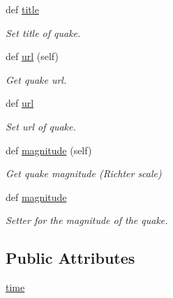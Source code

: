 \begin{DoxyCompactItemize}
def \hyperlink{classbridges_1_1data__src__dependent_1_1earthquake__usgs_1_1_earthquake_u_s_g_s_a8aa7ec15933f9416f84367a38a192575}{title}
\begin{DoxyCompactList}\small\item\em Set title of quake. \end{DoxyCompactList}\item 
def \hyperlink{classbridges_1_1data__src__dependent_1_1earthquake__usgs_1_1_earthquake_u_s_g_s_a449a372a14b288f7fd71066fb3886cd1}{url} (self)
\begin{DoxyCompactList}\small\item\em Get quake url. \end{DoxyCompactList}\item 
def \hyperlink{classbridges_1_1data__src__dependent_1_1earthquake__usgs_1_1_earthquake_u_s_g_s_afc4af59842186d2f0198b3e6d0690a95}{url}
\begin{DoxyCompactList}\small\item\em Set url of quake. \end{DoxyCompactList}\item 
def \hyperlink{classbridges_1_1data__src__dependent_1_1earthquake__usgs_1_1_earthquake_u_s_g_s_a2ada4ba221f09e4fd249ba53f5647d61}{magnitude} (self)
\begin{DoxyCompactList}\small\item\em Get quake magnitude (Richter scale) \end{DoxyCompactList}\item 
def \hyperlink{classbridges_1_1data__src__dependent_1_1earthquake__usgs_1_1_earthquake_u_s_g_s_a103f7a3eee708e299c73d79843fd2187}{magnitude}
\begin{DoxyCompactList}\small\item\em Setter for the magnitude of the quake. \end{DoxyCompactList}\end{DoxyCompactItemize}
\subsection*{Public Attributes}
\begin{DoxyCompactItemize}
\item 
\hyperlink{classbridges_1_1data__src__dependent_1_1earthquake__usgs_1_1_earthquake_u_s_g_s_aacc317fa18e83353df6c8ffb3d47d6c1}{time}
\end{DoxyCompactItemize}


